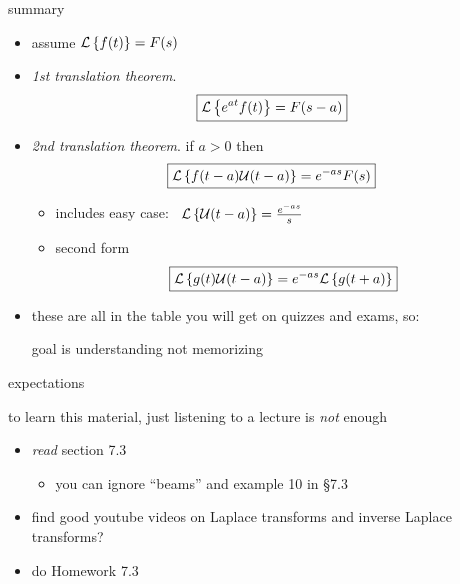 \documentclass[dvipsnames,colorlinks]{beamer}
\begin{document}
\begin{frame}{summary}

\begin{itemize}
\item assume $\mathcal{L}\left\{f(t)\right\}=F(s)$
\item \emph{1st translation theorem}.
    $$\boxed{\mathcal{L}\left\{e^{at} f(t)\right\} = F(s-a)}$$
\item \emph{2nd translation theorem}.  if $a>0$ then
    $$\boxed{\mathcal{L}\left\{f(t-a) \mathcal{U}(t-a)\right\} = e^{-as} F(s)}$$

\vspace{-2mm}
    \begin{itemize}
    \item includes easy case: \, $\mathcal{L}\left\{\mathcal{U}(t-a)\right\} = \frac{e^{-as}}{s}$
    \item second form
        $$\boxed{\mathcal{L}\left\{g(t) \mathcal{U}(t-a)\right\} = e^{-as} \mathcal{L}\left\{g(t+a)\right\}}$$
    \end{itemize}

\medskip
\item these are all in the table you will get on quizzes and exams, so:

\centerline{\alert{goal is understanding not memorizing}}
\end{itemize}
\end{frame}


\begin{frame}{expectations}

to learn this material, just listening to a lecture is \emph{not} enough
     \begin{itemize}
     \item \emph{read} section 7.3
         \begin{itemize}
         \item you can ignore ``beams'' and example 10 in \S7.3
         \end{itemize}
     \item find good youtube videos on Laplace transforms and inverse Laplace transforms?
     \item do Homework 7.3
     \end{itemize}
\end{frame}
\end{document}
